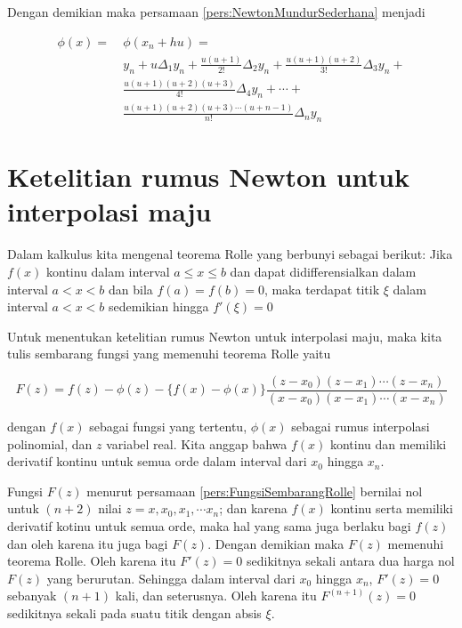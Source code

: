 Dengan demikian maka persamaan \ref{pers:NewtonMundurSederhana} menjadi

\begin{equation}
\begin{split}\label{pers:NewtonMundurUSederhana}
\phi(x) =~& \phi(x_n + hu) =\\
& y_n + u\Delta_1 y_n + \frac{u(u+1)}{2!}\Delta_2 y_n + \frac{u(u+1)(u+2)}{3!}\Delta_3 y_n+\\
& \frac{u(u+1)(u+2)(u+3)}{4!}\Delta_4 y_n + \cdots +\\
& \frac{u(u+1)(u+2)(u+3)\cdots(u+n-1)}{n!}\Delta_n y_n
\end{split}
\end{equation}

\section{Ketelitian rumus Newton untuk interpolasi maju}
Dalam kalkulus kita mengenal teorema Rolle yang berbunyi sebagai berikut: Jika $f(x)$ kontinu dalam interval $a \leq x \leq b$ dan dapat didifferensialkan dalam interval $a < x < b$ dan bila $f(a) = f(b) = 0$, maka terdapat titik $\xi$ dalam interval $a < x < b$ sedemikian hingga $f'(\xi) = 0$

Untuk menentukan ketelitian rumus Newton untuk interpolasi maju, maka kita tulis sembarang fungsi yang memenuhi teorema Rolle yaitu

\begin{equation}\label{pers:FungsiSembarangRolle}
F(z) = f(z) - \phi(z) - \{f(x) - \phi(x)\} \frac{(z-x_0)(z-x_1)\cdots(z-x_n)}{(x-x_0)(x-x_1)\cdots(x-x_n)}
\end{equation}

dengan $f(x)$ sebagai fungsi yang tertentu, $\phi(x)$ sebagai rumus interpolasi polinomial, dan $z$ variabel real. Kita anggap bahwa $f(x)$ kontinu dan memiliki derivatif kontinu untuk semua orde dalam interval dari $x_0$ hingga $x_n$.

Fungsi $F(z)$ menurut persamaan \ref{pers:FungsiSembarangRolle} bernilai nol untuk $(n+2)$ nilai $z = x, x_0, x_1,\cdots x_n$; dan karena $f(x)$ kontinu serta memiliki derivatif kotinu untuk semua orde, maka hal yang sama juga berlaku bagi $f(z)$ dan oleh karena itu juga bagi $F(z)$. Dengan demikian maka $F(z)$ memenuhi teorema Rolle. Oleh karena itu $F'(z)=0$ sedikitnya sekali antara dua harga nol $F(z)$ yang berurutan. Sehingga dalam interval dari $x_0$ hingga $x_n$, $F'(z)=0$ sebanyak $(n+1)$ kali, dan seterusnya. Oleh karena itu $F^{(n+1)}(z)=0$ sedikitnya sekali pada suatu titik dengan absis $\xi$.

